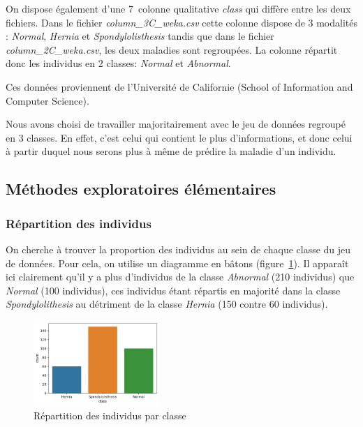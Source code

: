 \documentclass[twocolumn,10pt]{article}
\begin{document}
On dispose également d'une 7\ieme \ colonne qualitative \textit{class} qui diffère entre les deux fichiers. Dans le fichier \textit{column\_3C\_weka.csv} cette colonne dispose de 3 modalités : \textit{Normal}, \textit{Hernia} et \textit{Spondylolisthesis} tandis que dans le fichier \textit{column\_2C\_weka.csv}, les deux maladies sont regroupées. La colonne répartit donc les individus en 2 classes: \textit{Normal} et \textit{Abnormal}.

Ces données proviennent de l’Université de Californie (School of Information and Computer Science).

Nous avons choisi de travailler majoritairement avec le jeu de données regroupé en 3 classes. En effet, c'est celui qui contient le plus d'informations, et donc celui à partir duquel nous serons plus à même de prédire la maladie d'un individu.

\subsection{Méthodes exploratoires élémentaires}

\subsubsection{Répartition des individus}
On cherche à trouver la proportion des individus au sein de chaque classe du jeu de données. Pour cela, on utilise un diagramme en bâtons (figure~\ref{fig:nbr_individus_par_classe}).
Il apparaît ici clairement qu'il y a plus d'individus de la classe \textit{Abnormal} (210 individus) que \textit{Normal} (100 individus), ces individus étant répartis en majorité dans la classe \textit{Spondylolithesis} au détriment de la classe \textit{Hernia} (150 contre 60 individus).

\begin{figure}[htbp]
    \begin{center}
    \includegraphics[width=0.425\textwidth]{figures/nbr_individus_par_classe.png}
    \caption{\label{fig:nbr_individus_par_classe}Répartition des individus par classe}
    \end{center}
\end{figure}
\end{document}
